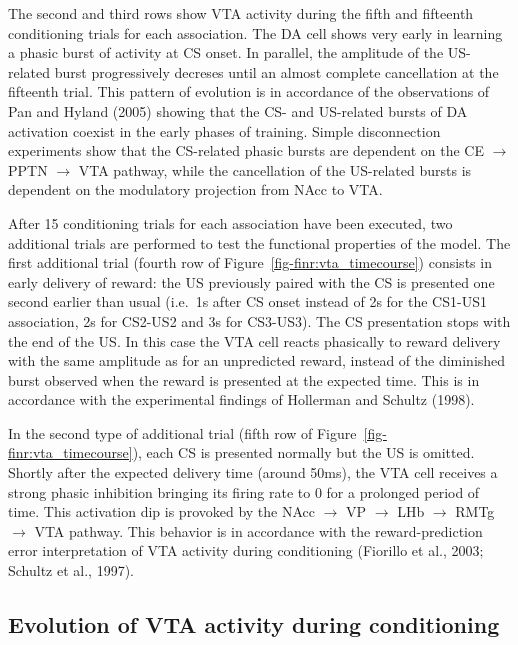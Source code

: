 \documentclass[
  11pt,
  a4paper,
]{scrbook}
\begin{document}
The second and third rows show VTA activity during the fifth and
fifteenth conditioning trials for each association. The DA cell shows
very early in learning a phasic burst of activity at CS onset. In
parallel, the amplitude of the US-related burst progressively decreses
until an almost complete cancellation at the fifteenth trial. This
pattern of evolution is in accordance of the observations of Pan and
Hyland (2005) showing that the CS- and US-related bursts of DA
activation coexist in the early phases of training. Simple disconnection
experiments show that the CS-related phasic bursts are dependent on the
CE \(\rightarrow\) PPTN \(\rightarrow\) VTA pathway, while the
cancellation of the US-related bursts is dependent on the modulatory
projection from NAcc to VTA.

After 15 conditioning trials for each association have been executed,
two additional trials are performed to test the functional properties of
the model. The first additional trial (fourth row of
Figure~\ref{fig-finr:vta_timecourse}) consists in early delivery of
reward: the US previously paired with the CS is presented one second
earlier than usual (i.e.~1s after CS onset instead of 2s for the CS1-US1
association, 2s for CS2-US2 and 3s for CS3-US3). The CS presentation
stops with the end of the US. In this case the VTA cell reacts
phasically to reward delivery with the same amplitude as for an
unpredicted reward, instead of the diminished burst observed when the
reward is presented at the expected time. This is in accordance with the
experimental findings of Hollerman and Schultz (1998).

In the second type of additional trial (fifth row of
Figure~\ref{fig-finr:vta_timecourse}), each CS is presented normally but
the US is omitted. Shortly after the expected delivery time (around
50ms), the VTA cell receives a strong phasic inhibition bringing its
firing rate to 0 for a prolonged period of time. This activation dip is
provoked by the NAcc \(\rightarrow\) VP \(\rightarrow\) LHb
\(\rightarrow\) RMTg \(\rightarrow\) VTA pathway. This behavior is in
accordance with the reward-prediction error interpretation of VTA
activity during conditioning (Fiorillo et al., 2003; Schultz et al.,
1997).

\subsection{Evolution of VTA activity during
conditioning}\label{evolution-of-vta-activity-during-conditioning}
\end{document}

